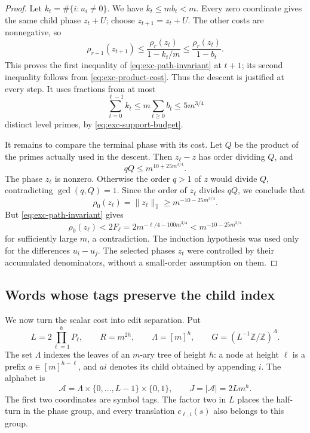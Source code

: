 \begin{proof}
Let $k_t=\#\{i:u_i\ne0\}$.  We have $k_t\le mb_t<m$.  Every zero coordinate
gives the same child phase $z_t+U$; choose
$z_{t+1}=z_t+U$.  The other costs are nonnegative, so
\begin{equation}\label{eq:exc-path-cost}
 \rho_{r-1}(z_{t+1})
 \le\frac{\rho_r(z_t)}{1-k_t/m}
 \le\frac{\rho_r(z_t)}{1-b_t}.
\end{equation}
This proves the first inequality of \eqref{eq:exc-path-invariant} at
$t+1$; its second inequality follows from \eqref{eq:exc-product-cost}.
Thus the descent is justified at every step.  It uses fractions from at
most
\begin{equation}\label{eq:exc-denominator-count}
 \sum_{t=0}^{\ell-1}k_t
 \le m\sum_{t\ge0}b_t\le5m^{3/4}
\end{equation}
distinct level primes, by \eqref{eq:exc-support-budget}.

It remains to compare the terminal phase with its cost.  Let $Q$ be the
product of the primes actually used in the descent.  Then $z_\ell-z$ has
order dividing $Q$, and
\[
 qQ\le m^{10+25m^{3/4}}.
\]
The phase $z_\ell$ is nonzero.  Otherwise the order $q>1$ of $z$ would
divide $Q$, contradicting $\gcd(q,Q)=1$.  Since the order of $z_\ell$
divides $qQ$, we conclude that
\[
 \rho_0(z_\ell)=\|z_\ell\|_{\mathbb T}
 \ge m^{-10-25m^{3/4}}.
\]
But \eqref{eq:exc-path-invariant} gives
\[
 \rho_0(z_\ell)<2F_\ell
   =2m^{-\ell/4-100m^{3/4}}
   <m^{-10-25m^{3/4}}
\]
for sufficiently large $m$, a contradiction.  The induction hypothesis
was used only for the differences $u_i-u_j$.  The selected phases $z_t$
were controlled by their accumulated denominators, without a small-order
assumption on them.
\end{proof}

\subsection{Words whose tags preserve the child index}

We now turn the scalar cost into edit separation.  Put
\begin{equation}\label{eq:exc-size-parameters}
 L=2\prod_{\ell=1}^hP_\ell,\qquad R=m^{2h},\qquad
 \Lambda=[m]^h,\qquad
 G=(L^{-1}\mathbb Z/\mathbb Z)^\Lambda .
\end{equation}
The set $\Lambda$ indexes the leaves of an $m$-ary tree of height $h$:
a node at height $\ell$ is a prefix $a\in[m]^{h-\ell}$, and $ai$ denotes
its child obtained by appending $i$.  The alphabet is
\[
 \mathcal A=\Lambda\times\{0,\ldots,L-1\}\times\{0,1\},
 \qquad J=|\mathcal A|=2Lm^h.
\]
The first two coordinates are symbol tags.  The factor two in $L$ places
the half-turn in the phase group, and every translation
$c_{\ell,i}(s)$ also belongs to this group.

